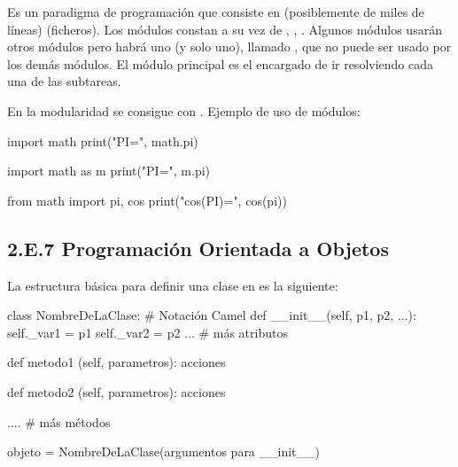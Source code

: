 Es un paradigma de programación que consiste en  (posiblemente de  miles de líneas)  (ficheros). 
Los módulos constan a su vez de , , . 
Algunos módulos usarán otros módulos pero habrá uno (y solo uno), llamado , que no puede ser usado por los demás módulos.
El módulo principal es el encargado de ir resolviendo cada una de las subtareas.


En  la modularidad se consigue con . Ejemplo de uso de módulos:

\begin{minipage}{.31\textwidth}  
\begin{pyconsole}[][frame=single]
import math 
print("PI=", math.pi)
\end{pyconsole}
\end{minipage}
%
\begin{minipage}{.31\textwidth}
\begin{pyconsole}[][frame=single]
import math as m
print("PI=", m.pi)
\end{pyconsole}
\end{minipage}
%
\begin{minipage}{.33\textwidth}
\begin{pyconsole}[][frame=single]
from math import pi, cos
print("cos(PI)=", cos(pi))
\end{pyconsole}
\end{minipage}





\label{subsec:ClasesEnPython}
\subsection*{2.E.7 Programación Orientada a Objetos \label{subsec:POO}}


La estructura básica para definir una clase en  es la siguiente:

\hfil \begin{minipage}{.75\textwidth}
\begin{pyverbatim}[][frame=single]
class NombreDeLaClase: # Notación Camel
    def __init__(self, p1, p2, ...):
        self._var1 = p1
        self._var2 = p2
        ...  # más atributos
        
    def metodo1 (self, parametros):
        acciones
            
    def metodo2 (self, parametros):
        acciones
            
     .... # más métodos
        
objeto = NombreDeLaClase(argumentos para __init__)
\end{pyverbatim}
\end{minipage}

